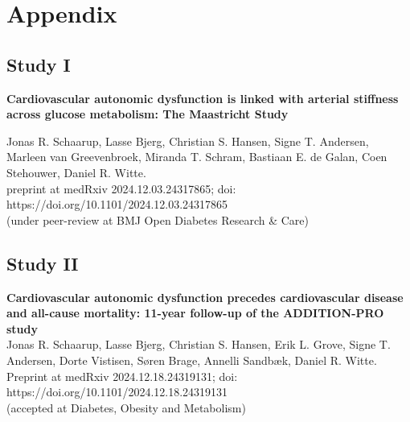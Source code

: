 \documentclass[
  a4paper,
  headsepline=true,
  open=left]{scrbook}
\begin{document}
\clearpage
\null
\thispagestyle{empty}
\clearpage

\cleardoublepage
{}
{}
\appendix

\hypertarget{sec-more-results}{%
\chapter{Appendix}\label{sec-more-results}}

\hypertarget{study-i-1}{%
\section{Study I}\label{study-i-1}}

\textbf{Cardiovascular autonomic dysfunction is linked with arterial
stiffness across glucose metabolism: The Maastricht Study}

Jonas R. Schaarup, Lasse Bjerg, Christian S. Hansen, Signe T. Andersen,
Marleen van Greevenbroek, Miranda T. Schram, Bastiaan E. de Galan, Coen
Stehouwer, Daniel R. Witte.~\\
preprint at medRxiv 2024.12.03.24317865; doi:
https://doi.org/10.1101/2024.12.03.24317865\\
(under peer-review at BMJ Open Diabetes Research \& Care)

\clearpage
\null
\thispagestyle{empty}
\clearpage






\newpage
\restoregeometry

\newpage

\thispagestyle{empty}

\newpage

\hypertarget{study-ii-1}{%
\section{Study II}\label{study-ii-1}}

\textbf{Cardiovascular autonomic dysfunction precedes cardiovascular
disease and all-cause mortality: 11-year follow-up of the ADDITION-PRO
study}\\

Jonas R. Schaarup, Lasse Bjerg, Christian S. Hansen, Erik L. Grove,
Signe T. Andersen, Dorte Vistisen, Søren Brage, Annelli Sandbæk, Daniel
R. Witte.~\\
Preprint at medRxiv 2024.12.18.24319131; doi:
https://doi.org/10.1101/2024.12.18.24319131~\\
(accepted at Diabetes, Obesity and Metabolism)
\end{document}
